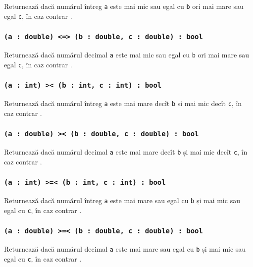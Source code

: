 Returnează \true{} dacă numărul întreg \texttt{a} este mai mic sau egal cu \texttt{b} ori mai mare sau egal \texttt{c}, în caz contrar \false{}.

\subsubsection{\texttt{(a : double) <=> (b : double, c : double) : bool}}

Returnează \true{} dacă numărul decimal \texttt{a} este mai mic sau egal cu \texttt{b} ori mai mare sau egal \texttt{c}, în caz contrar \false{}.

\subsubsection{\texttt{(a : int) >< (b : int, c : int) : bool}}

Returnează \true{} dacă numărul întreg \texttt{a} este mai mare decît \texttt{b} și mai mic decît \texttt{c}, în caz contrar \false{}.

\subsubsection{\texttt{(a : double) >< (b : double, c : double) : bool}}

Returnează \true{} dacă numărul decimal \texttt{a} este mai mare decît \texttt{b} și mai mic decît \texttt{c}, în caz contrar \false{}.

\subsubsection{\texttt{(a : int) >=< (b : int, c : int) : bool}}

Returnează \true{} dacă numărul întreg \texttt{a} este mai mare sau egal cu \texttt{b} și mai mic sau egal cu \texttt{c}, în caz contrar \false{}.

\subsubsection{\texttt{(a : double) >=< (b : double, c : double) : bool}}

Returnează \true{} dacă numărul decimal \texttt{a} este mai mare sau egal cu \texttt{b} și mai mic sau egal cu \texttt{c}, în caz contrar \false{}.

